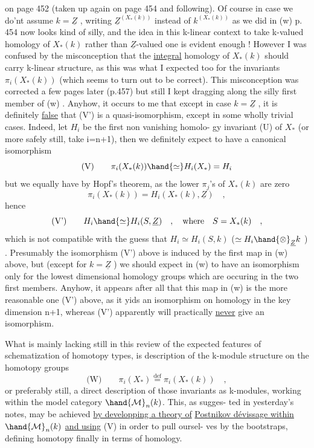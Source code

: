 
on page 452 (taken up again on page 454 and following).   Of course in
case we do'nt assume $k=\underline{Z}$ ,  writing $\underline{Z}^{(X_*(k))}$ instead of $k^{(X_*(k))}$ as
we did in (w) p. 454 now looks kind of silly,  and the idea in this 
k-linear context to take k-valued homology of $X_*(k)$ rather than $\underline{Z}$-valued
one is evident enough !  However I was confused by the misconception that
the \uline{integral} homology of $X_*(k)$ should carry k-linear structure, as
this was what I expected too for the invariants $\pi_i(X_*(k))$ (which seems
to turn out to be correct).  This misconception was corrected a few
pages later (p.457) but still I kept dragging along the silly first
member of (w) .  Anyhow, it  occurs to me that except in case $k=\underline{Z}$ , it
is definitely \uline{false} that (V') is a quasi-isomorphism, except in some
wholly trivial cases.  Indeed, let $H_i$ be the first non vanishing homolo-%
gy invariant (U) of $X_*$ (or more safely still, take i=n+1), then
we definitely expect to have a canonical isomorphism 
\[ \text{(V)} \qquad \pi_i(X_*(k)) \hand{\simeq} H_i(X_*) = H_i \]
but we equally have by Hopf's theorem, as the lower $\pi_j$'s of $X_*(k)$ are
zero
\[ \pi_i(X_*(k)) = H_i(X_*(k), \underline{Z}) \quad , \]
hence 
\[ \text{(V')} \qquad H_i \hand{\simeq} H_i(S,\underline{Z}) \quad , \quad \text{where} \quad S = X_*(k) \quad , \]
which is not compatible with the guess that $H_i \simeq H_i(S,k)$ ($\simeq H_i \hand{\otimes}_{\underline{Z}} k$ ) .
Presumably the isomorphism (V') above is induced by the first
map in (w) above, but (except for $k=\underline{Z}$ ) we should expect in (w) to
have an isomorphism only for the lowest dimensional homology groups
which are occuring in the two first members.  Anyhow, it appears after
all that this map in (w) is the more reasonable one   (V') above, as
it yids an isomorphism on homology in the key dimension n+1, whereas
(V') apparently will practically \uline{never} give an isomorphism.

What is mainly lacking still in this review of the  expected 
features of schematization of homotopy types, is description of the
k-module structure on the homotopy groups
\[ \text{(W)} \qquad \pi_i(X_*) \overset{\mathrm{def}}{=} \pi_i(X_*(k)) \quad , \]
or preferably still, a direct description of those invariants as
k-modules, working within the model category $\hand{\mathcal{M}}_n(k)$.  This, as sugges-%
ted in yesterday's notes, may be achieved \uline{by developping a theory of}
\uline{Postnikov dévissage within} $\hand{\mathcal{M}}_n(k)$ \uline{and using} (V) in order to pull oursel-%
ves by the bootstraps, defining homotopy finally in terms of homology.

